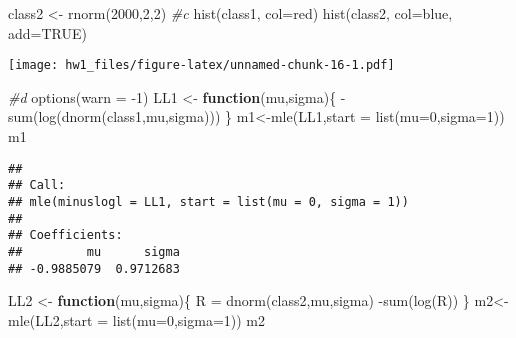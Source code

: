\documentclass[
]{article}
\newenvironment{Shaded}{\begin{snugshade}}{\end{snugshade}}
\newcommand{\AttributeTok}[1]{\textcolor[rgb]{0.77,0.63,0.00}{#1}}
\newcommand{\CommentTok}[1]{\textcolor[rgb]{0.56,0.35,0.01}{\textit{#1}}}
\newcommand{\ConstantTok}[1]{\textcolor[rgb]{0.00,0.00,0.00}{#1}}
\newcommand{\ControlFlowTok}[1]{\textcolor[rgb]{0.13,0.29,0.53}{\textbf{#1}}}
\newcommand{\DecValTok}[1]{\textcolor[rgb]{0.00,0.00,0.81}{#1}}
\newcommand{\FunctionTok}[1]{\textcolor[rgb]{0.00,0.00,0.00}{#1}}
\newcommand{\NormalTok}[1]{#1}
\newcommand{\OtherTok}[1]{\textcolor[rgb]{0.56,0.35,0.01}{#1}}
\newcommand{\SpecialCharTok}[1]{\textcolor[rgb]{0.00,0.00,0.00}{#1}}
\newcommand{\StringTok}[1]{\textcolor[rgb]{0.31,0.60,0.02}{#1}}
\begin{document}
\begin{Shaded}
\begin{Highlighting}[]
\NormalTok{class2 }\OtherTok{\textless{}{-}} \FunctionTok{rnorm}\NormalTok{(}\DecValTok{2000}\NormalTok{,}\DecValTok{2}\NormalTok{,}\DecValTok{2}\NormalTok{)}
\CommentTok{\#c}
\FunctionTok{hist}\NormalTok{(class1, }\AttributeTok{col=}\StringTok{\textquotesingle{}red\textquotesingle{}}\NormalTok{)}
\FunctionTok{hist}\NormalTok{(class2, }\AttributeTok{col=}\StringTok{\textquotesingle{}blue\textquotesingle{}}\NormalTok{, }\AttributeTok{add=}\ConstantTok{TRUE}\NormalTok{)}
\end{Highlighting}
\end{Shaded}

\texttt{[image: hw1\_files/figure-latex/unnamed-chunk-16-1.pdf]}

\begin{Shaded}
\begin{Highlighting}[]
\CommentTok{\#d}
\FunctionTok{options}\NormalTok{(}\AttributeTok{warn =} \SpecialCharTok{{-}}\DecValTok{1}\NormalTok{)}
\NormalTok{LL1 }\OtherTok{\textless{}{-}} \ControlFlowTok{function}\NormalTok{(mu,sigma)\{}
  \SpecialCharTok{{-}}\FunctionTok{sum}\NormalTok{(}\FunctionTok{log}\NormalTok{(}\FunctionTok{dnorm}\NormalTok{(class1,mu,sigma)))}
\NormalTok{\}}
\NormalTok{m1}\OtherTok{\textless{}{-}}\FunctionTok{mle}\NormalTok{(LL1,}\AttributeTok{start =} \FunctionTok{list}\NormalTok{(}\AttributeTok{mu=}\DecValTok{0}\NormalTok{,}\AttributeTok{sigma=}\DecValTok{1}\NormalTok{))}
\NormalTok{m1}
\end{Highlighting}
\end{Shaded}

\begin{verbatim}
## 
## Call:
## mle(minuslogl = LL1, start = list(mu = 0, sigma = 1))
## 
## Coefficients:
##         mu      sigma 
## -0.9885079  0.9712683
\end{verbatim}

\begin{Shaded}
\begin{Highlighting}[]
\NormalTok{LL2 }\OtherTok{\textless{}{-}} \ControlFlowTok{function}\NormalTok{(mu,sigma)\{}
\NormalTok{  R }\OtherTok{=} \FunctionTok{dnorm}\NormalTok{(class2,mu,sigma)}
  \SpecialCharTok{{-}}\FunctionTok{sum}\NormalTok{(}\FunctionTok{log}\NormalTok{(R))}
\NormalTok{\}}
\NormalTok{m2}\OtherTok{\textless{}{-}}\FunctionTok{mle}\NormalTok{(LL2,}\AttributeTok{start =} \FunctionTok{list}\NormalTok{(}\AttributeTok{mu=}\DecValTok{0}\NormalTok{,}\AttributeTok{sigma=}\DecValTok{1}\NormalTok{))}
\NormalTok{m2}
\end{Highlighting}
\end{Shaded}
\end{document}
